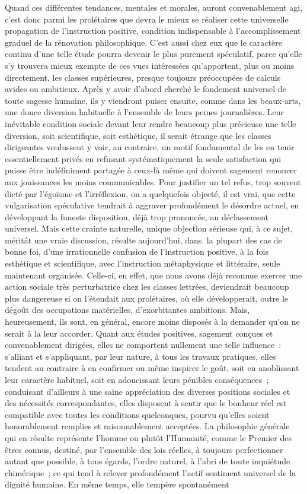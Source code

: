\documentclass[french,twoside]{book} %
\begin{document}
Quand ces différentes tendances, mentales et morales, auront convenablement agi, c’est donc parmi les prolétaires que devra le mieux se réaliser cette universelle propagation de l’instruction positive, condition indispensable à l’accomplissement graduel de la rénovation philosophique. C’est aussi chez eux que le caractère continu d’une telle étude pourra devenir le plus purement spéculatif, parce qu’elle s’y trouvera mieux exempte de ces vues intéressées qu’apportent, plus ou moins directement, les classes supérieures, presque toujours préoccupées de calculs avides ou ambitieux. Après y avoir d’abord cherché le fondement universel de toute sagesse humaine, ils y viendront puiser ensuite, comme dans les beaux-arts, une douce diversion habituelle à l’ensemble de leurs peines journalières. Leur inévitable condition sociale devant leur rendre beaucoup plus précieuse une telle diversion, soit scientifique, soit esthétique, il serait étrange que les classes dirigeantes voulussent y voir, au contraire, un motif fondamental de les en tenir essentiellement privés en refusant systématiquement la seule satisfaction qui puisse être indéfiniment partagée à ceux-là même qui doivent sagement renoncer aux jouissances les moins communicables. Pour justifier un tel refus, trop souvent dicté par l’égoïsme et l’irréflexion, on a quelquefois objecté, il est vrai, que cette vulgarisation spéculative tendrait à aggraver profondément le désordre actuel, en développant la funeste disposition, déjà trop prononcée, au déclassement universel. Mais cette crainte naturelle, unique objection sérieuse qui, à ce sujet, méritât une vraie discussion, résulte aujourd’hui, dans. la plupart des cas de bonne foi, d’une irrationnelle confusion de l’instruction positive, à la fois esthétique et scientifique, avec l’instruction métaphysique et littéraire, seule maintenant organisée. Celle-ci, en effet, que nous avons déjà reconnue exercer une action sociale très perturbatrice chez les classes lettrées, deviendrait beaucoup plus dangereuse si on l’étendait aux prolétaires, où elle développerait, outre le dégoût des occupations matérielles, d’exorbitantes ambitions. Mais, heureusement, ils sont, en général, encore moins disposés à la demander qu’on ne serait à la leur accorder. Quant aux études positives, sagement conçues et convenablement dirigées, elles ne comportent nullement une telle influence : s’alliant et s’appliquant, par leur nature, à tous les travaux pratiques, elles tendent au contraire à en confirmer ou même inspirer le goût, soit en anoblissant leur caractère habituel, soit en adoucissant leurs pénibles conséquences ; conduisant d’ailleurs à une saine appréciation des diverses positions sociales et des nécessités correspondantes, elles disposent à sentir que le bonheur réel est compatible avec toutes les conditions quelconques, pourvu qu’elles soient honorablement remplies et raisonnablement acceptées. La philosophie générale qui en résulte représente l’homme ou plutôt l’Humanité, comme le Premier des êtres connus, destiné, par l’ensemble des lois réelles, à toujours perfectionner autant que possible, à tous égards, l’ordre naturel, à l’abri de toute inquiétude chimérique ; ce qui tend à relever profondément l’actif sentiment universel de la dignité humaine. En même temps, elle tempère spontanément 
\end{document}
